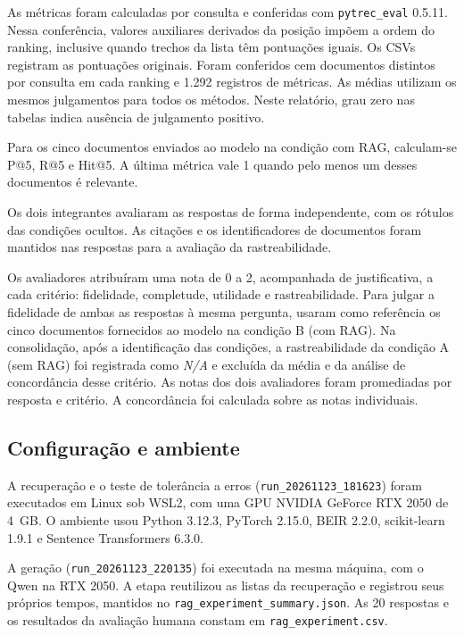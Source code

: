 \documentclass[12pt]{article}
\begin{document}
As métricas foram calculadas por consulta e conferidas com \texttt{pytrec\_eval}
0.5.11. Nessa conferência, valores auxiliares derivados da posição impõem
a ordem do ranking, inclusive quando trechos da lista têm pontuações iguais.
Os CSVs registram as pontuações originais. Foram conferidos cem documentos
distintos por consulta em cada ranking e 1.292 registros de métricas. As
médias utilizam os mesmos julgamentos para todos os métodos. Neste relatório,
grau zero nas tabelas indica ausência de julgamento positivo.

Para os cinco documentos enviados ao modelo na condição com RAG,
calculam-se P@5, R@5 e Hit@5. A última métrica vale 1 quando pelo menos
um desses documentos é relevante.

Os dois integrantes avaliaram as respostas de forma independente, com os
rótulos das condições ocultos. As citações e os identificadores de
documentos foram mantidos nas respostas para a avaliação
da rastreabilidade.

Os avaliadores atribuíram uma nota de 0 a 2, acompanhada de justificativa,
a cada critério: fidelidade, completude, utilidade e rastreabilidade.
Para julgar a fidelidade de ambas as respostas à mesma pergunta, usaram
como referência os cinco documentos fornecidos ao modelo na condição B
(com RAG). Na consolidação, após a identificação das condições, a
rastreabilidade da condição A (sem RAG) foi registrada como \textit{N/A}
e excluída da média e da análise de concordância desse critério. As notas
dos dois avaliadores foram promediadas por resposta e critério. A
concordância foi calculada sobre as notas individuais.

\subsection{Configuração e ambiente}

A recuperação e o teste de tolerância a erros (\texttt{run\_20261123\_181623})
foram executados em Linux sob WSL2,
com uma GPU NVIDIA GeForce RTX 2050 de 4~GB. O ambiente usou Python
3.12.3, PyTorch 2.15.0, BEIR 2.2.0, scikit-learn 1.9.1 e Sentence
Transformers 6.3.0.

A geração (\texttt{run\_20261123\_220135}) foi executada na mesma máquina,
com o Qwen na RTX 2050. A etapa reutilizou as listas da recuperação e
registrou seus próprios tempos, mantidos no
\texttt{rag\_experiment\_summary.json}. As 20 respostas e os resultados
da avaliação humana constam em \texttt{rag\_experiment.csv}.
\end{document}
